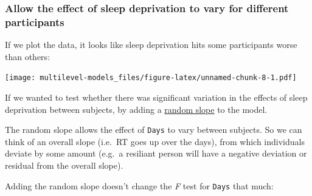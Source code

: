\documentclass[]{article}
\newenvironment{Shaded}{\begin{snugshade}}{\end{snugshade}}
\newcommand{\KeywordTok}[1]{\textcolor[rgb]{0.13,0.29,0.53}{\textbf{#1}}}
\newcommand{\DataTypeTok}[1]{\textcolor[rgb]{0.13,0.29,0.53}{#1}}
\newcommand{\DecValTok}[1]{\textcolor[rgb]{0.00,0.00,0.81}{#1}}
\newcommand{\StringTok}[1]{\textcolor[rgb]{0.31,0.60,0.02}{#1}}
\newcommand{\OperatorTok}[1]{\textcolor[rgb]{0.81,0.36,0.00}{\textbf{#1}}}
\newcommand{\NormalTok}[1]{#1}
\theoremstyle{definition}
\theoremstyle{definition}
\theoremstyle{definition}
\theoremstyle{remark}
\begin{document}
\subsubsection*{Allow the effect of sleep deprivation to vary for
different
participants}\label{allow-the-effect-of-sleep-deprivation-to-vary-for-different-participants}

If we plot the data, it looks like sleep deprivation hits some
participants worse than others:

\begin{Shaded}
\end{Shaded}

\texttt{[image: multilevel-models\_files/figure-latex/unnamed-chunk-8-1.pdf]}

If we wanted to test whether there was significant variation in the
effects of sleep deprivation between subjects, by adding a
\protect\hyperlink{random-slopes-intercepts}{random slope} to the model.

The random slope allows the effect of \texttt{Days} to vary between
subjects. So we can think of an overall slope (i.e.~RT goes up over the
days), from which individuals deviate by some amount (e.g.~a resiliant
person will have a negative deviation or residual from the overall
slope).

Adding the random slope doesn't change the \emph{F} test for
\texttt{Days} that much:
\end{document}
